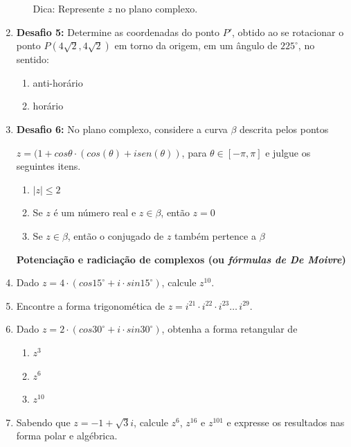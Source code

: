 \documentclass[a4paper, 11pt]{article}
\begin{document}
\begin{enumerate}
\begin{enumerate}
	Dica: Represente $z$ no plano complexo.
	\end{enumerate}

\item \textbf {Desafio 5:} Determine as coordenadas do ponto $P'$, obtido ao se rotacionar o ponto $ P(4\sqrt{2} , 4\sqrt{2})$  em torno da origem, em um ângulo de $225^{\circ}$, no sentido:
	\begin{enumerate}
	\item anti-horário
	\item horário
	\end{enumerate}
	
\item \textbf{Desafio 6:}  No plano complexo, considere a curva $\beta$ descrita pelos pontos 

$z = (1 + cos\theta \cdot (cos(\theta) + isen(\theta))$, para $\theta \in [-\pi, \pi]$ e julgue os seguintes itens.
	\begin{enumerate}
	\item $|z| \leq 2$
	\item Se $z$ é um número real e $z \in \beta$, então $z = 0$
	\item Se $z \in \beta$, então o conjugado de $z$ também pertence a $\beta$
	\end{enumerate}



\begin{center}
	\textbf{Potenciação e radiciação de complexos (ou \textit{fórmulas de De Moivre})}
	\\
\end{center}


\item Dado $z = 4\cdot(cos15^{\circ} + i\cdot sin15^{\circ})$, calcule $z^{10}$.

\item Encontre a forma trigonomética de $z = i^{21}\cdot i^{22}\cdot i^{23} \ldots \, i^{29}$. 

\item Dado $z = 2\cdot(cos30^{\circ} + i\cdot sin30^{\circ})$, obtenha a forma retangular de
	\begin{enumerate}
	\item $z^3$
	\item $z^6$
	\item $z^{10}$
	\end{enumerate}
	
\item Sabendo que $z = -1 + \sqrt{3}i$, calcule $z^{6}$, $z^{16}$ e $z^{101}$ e expresse os resultados nas forma polar e algébrica.



\end{enumerate}
\end{document}
